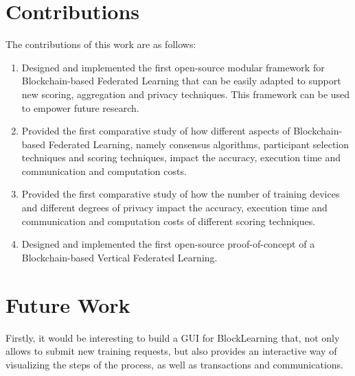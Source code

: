 
\section{Contributions}\label{conclusions:contributions}

The contributions of this work are as follows:

\begin{enumerate}
    \item Designed and implemented the first open-source modular framework for Blockchain-based Federated Learning that can be easily adapted to support new scoring, aggregation and privacy techniques. This framework can be used to empower future research.
    
    \item Provided the first comparative study of how different aspects of Blockchain-based Federated Learning, namely consensus algorithms, participant selection techniques and scoring techniques, impact the accuracy, execution time and communication and computation costs.
    
    \item Provided the first comparative study of how the number of training devices and different degrees of privacy impact the accuracy, execution time and communication and computation costs of different scoring techniques.
    
    \item Designed and implemented the first open-source proof-of-concept of a Blockchain-based Vertical Federated Learning.
\end{enumerate}

\section{Future Work}\label{conclusions:future_work}

Firstly, it would be interesting to build a GUI for BlockLearning that, not only allows to submit new training requests, but also provides an interactive way of visualizing the steps of the process, as well as transactions and communications.

